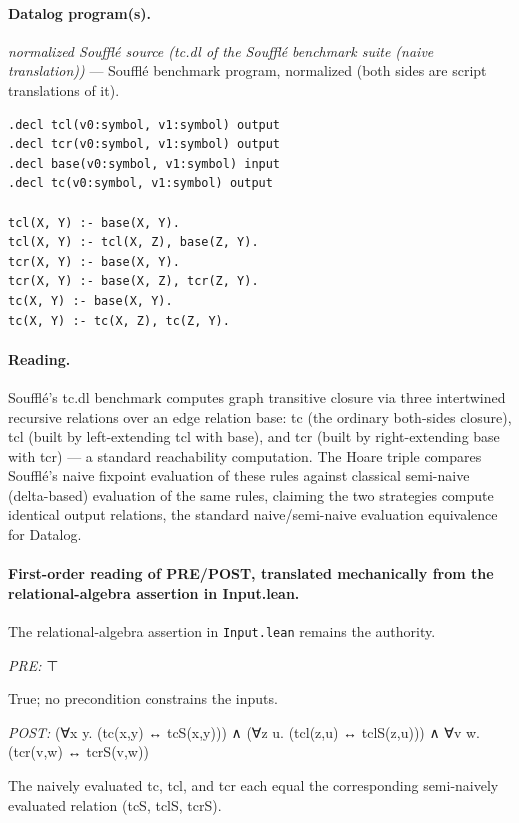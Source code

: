 \documentclass[10pt]{article}
\begin{document}
\paragraph{Datalog program(s).}

{\raggedright\textit{normalized Soufflé source (tc.dl of the Soufflé benchmark suite (naive translation))} --- Soufflé benchmark program, normalized (both sides are script translations of it).\par}

\begin{Verbatim}[fontsize=\scriptsize,breaklines=true,breakanywhere=true,frame=single,framesep=1.5mm]
.decl tcl(v0:symbol, v1:symbol) output
.decl tcr(v0:symbol, v1:symbol) output
.decl base(v0:symbol, v1:symbol) input
.decl tc(v0:symbol, v1:symbol) output

tcl(X, Y) :- base(X, Y).
tcl(X, Y) :- tcl(X, Z), base(Z, Y).
tcr(X, Y) :- base(X, Y).
tcr(X, Y) :- base(X, Z), tcr(Z, Y).
tc(X, Y) :- base(X, Y).
tc(X, Y) :- tc(X, Z), tc(Z, Y).
\end{Verbatim}

\paragraph{Reading.} Soufflé's tc.dl benchmark computes graph transitive closure via three intertwined recursive relations over an edge relation base: tc (the ordinary both-sides closure), tcl (built by left-extending tcl with base), and tcr (built by right-extending base with tcr) --- a standard reachability computation. The Hoare triple compares Soufflé's naive fixpoint evaluation of these rules against classical semi-naive (delta-based) evaluation of the same rules, claiming the two strategies compute identical output relations, the standard naive/semi-naive evaluation equivalence for Datalog.

\paragraph{First-order reading of PRE/POST, translated mechanically from the relational-algebra assertion in Input.lean.} The relational-algebra assertion in \texttt{Input.lean} remains the authority.

\textit{PRE:} ⊤\par True; no precondition constrains the inputs.

\textit{POST:} (∀x y. (tc(x,y) ↔ tcS(x,y))) ∧ (∀z u. (tcl(z,u) ↔ tclS(z,u))) ∧ ∀v w. (tcr(v,w) ↔ tcrS(v,w))\par The naively evaluated tc, tcl, and tcr each equal the corresponding semi-naively evaluated relation (tcS, tclS, tcrS).
\end{document}
